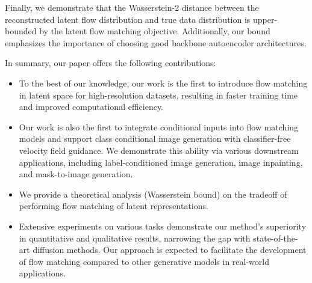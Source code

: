\documentclass{article}
\theoremstyle{plain}
\theoremstyle{definition}
\theoremstyle{remark}
\begin{document}
Finally, we demonstrate that the Wasserstein-2 distance between the reconstructed latent flow distribution and true data distribution is upper-bounded by the latent flow matching objective. Additionally, our bound emphasizes the importance of choosing good backbone autoencoder architectures.

In summary, our paper offers the following contributions:

\begin{itemize}
\item To the best of our knowledge, our work is the first to introduce flow matching in latent space for high-resolution datasets, resulting in faster training time and improved computational efficiency.
\item Our work is also the first to integrate conditional inputs into flow matching models and support class conditional image generation with classifier-free velocity field guidance. We demonstrate this ability via various downstream applications, including label-conditioned image generation, image inpainting, and mask-to-image generation.
\item We provide a theoretical analysis (Wasserstein bound) on the tradeoff of performing flow matching of latent representations.
\item Extensive experiments on various tasks demonstrate our method's superiority in quantitative and qualitative results, narrowing the gap with state-of-the-art diffusion methods. Our approach is expected to facilitate the development of flow matching compared to other generative models in real-world applications.
  
\end{itemize}
\end{document}
